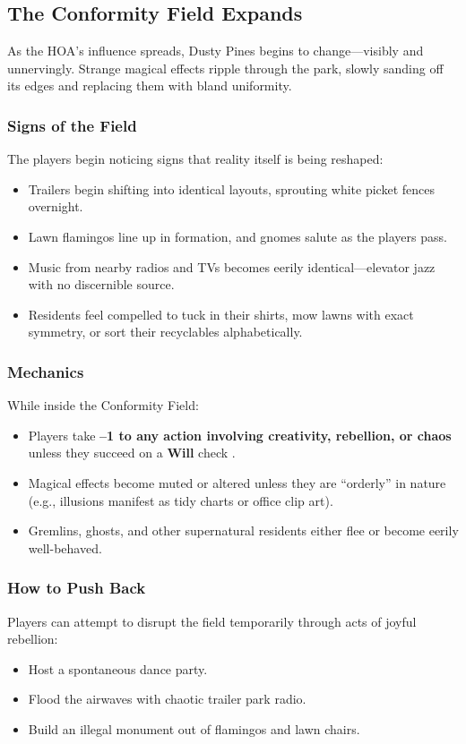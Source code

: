 \begin{multicols}{2}


\subsection{The Conformity Field Expands}

As the HOA’s influence spreads, Dusty Pines begins to change—visibly and unnervingly. Strange magical effects ripple through the park, slowly sanding off its edges and replacing them with bland uniformity.

\subsubsection*{Signs of the Field}
The players begin noticing signs that reality itself is being reshaped:
\begin{itemize}
    \item Trailers begin shifting into identical layouts, sprouting white picket fences overnight.
    \item Lawn flamingos line up in formation, and gnomes salute as the players pass.
    \item Music from nearby radios and TVs becomes eerily identical—elevator jazz with no discernible source.
    \item Residents feel compelled to tuck in their shirts, mow lawns with exact symmetry, or sort their recyclables alphabetically.
\end{itemize}

\subsubsection*{Mechanics}
While inside the Conformity Field:
\begin{itemize}
    \item Players take \textbf{–1 to any action involving creativity, rebellion, or chaos} unless they succeed on a \textbf{Will} check .
    \item Magical effects become muted or altered unless they are “orderly” in nature (e.g., illusions manifest as tidy charts or office clip art).
    \item Gremlins, ghosts, and other supernatural residents either flee or become eerily well-behaved.
\end{itemize}

\subsubsection*{How to Push Back}
Players can attempt to disrupt the field temporarily through acts of joyful rebellion:
\begin{itemize}
    \item Host a spontaneous dance party.
    \item Flood the airwaves with chaotic trailer park radio.
    \item Build an illegal monument out of flamingos and lawn chairs.
\end{itemize}


\end{multicols}
